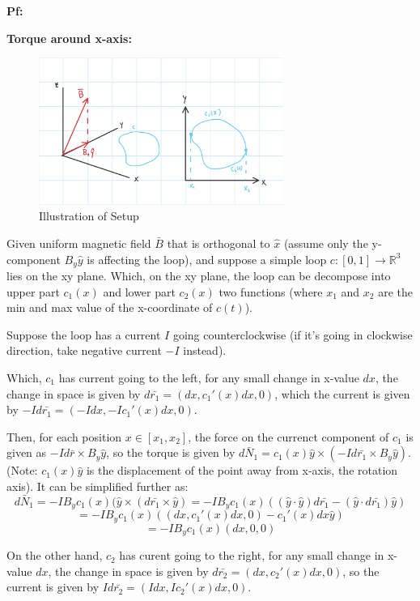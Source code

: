 \documentclass{article}
\begin{document}
\textbf{Pf:}

\textbf{Torque around x-axis:}

\begin{figure}[h!]
    \begin{center}
        \includegraphics[width=80mm]{IMG_0189.jpg}
        \caption{Illustration of Setup}
    \end{center}
\end{figure}

Given uniform magnetic field $\bar{B}$ that is orthogonal to $\hat{x}$ (assume only the y-component $B_y\hat{y}$ is affecting the loop), 
and suppose a simple loop $c:[0,1]\rightarrow \mathbb{R}^3$ lies on the xy plane. Which, on the xy plane,
the loop can be decompose into upper part $c_1(x)$ and lower part $c_2(x)$ two functions (where $x_1$ and $x_2$ are the min and max value of the x-coordinate of $c(t)$).

Suppose the loop has a current $I$ going counterclockwise (if it's going in clockwise direction, take negative current $-I$ instead).

\hfill

Which, $c_1$ has current going to the left, for any small change in x-value $dx$, the change in space is given by
$d\bar{r_1} = (dx, c_1'(x)dx,0)$, which the current is given by $-Id\bar{r_1} = (-Idx, -Ic_1'(x)dx,0)$.

Then, for each position $x\in [x_1,x_2]$, the force on the currenct component of $c_1$ is given as $-Id\bar{r}\times B_y\hat{y}$,
so the torque is given by $d\bar{N}_1=c_1(x)\hat{y}\times (-Id\bar{r_1}\times B_y\hat{y})$. (Note: $c_1(x)\hat{y}$ is the displacement of the point away from x-axis, the rotation axis).
It can be simplified further as:
$$d\bar{N}_1=-IB_yc_1(x)(\hat{y}\times (d\bar{r_1}\times \hat{y}) = -IB_yc_1(x)((\hat{y}\cdot\hat{y})d\bar{r_1}-(\hat{y}\cdot d\bar{r_1})\hat{y})$$
$$ = -IB_yc_1(x)((dx,c_1'(x)dx,0)-c_1'(x)dx\hat{y})$$
$$ = -IB_yc_1(x)(dx,0,0)$$

\hfill

On the other hand, $c_2$ has curent going to the right, for any small change in x-value $dx$, the change in space is given by 
$d\bar{r_2}=(dx,c_2'(x)dx,0)$, so the current is given by $Id\bar{r_2} = (Idx,Ic_2'(x)dx,0)$.
\end{document}
